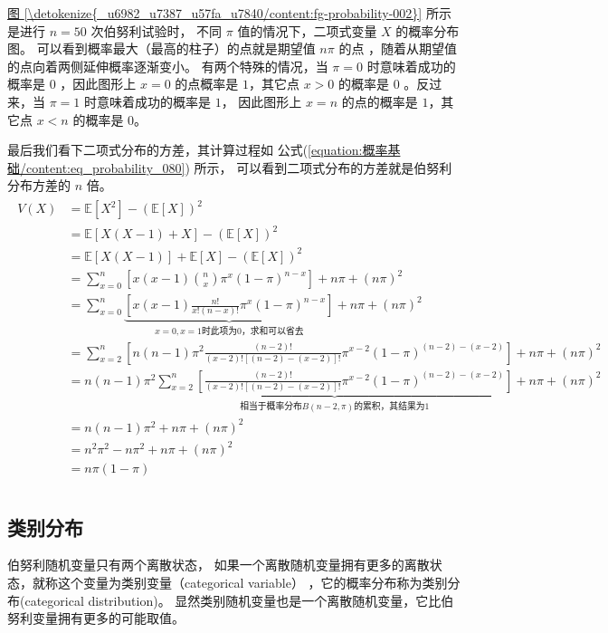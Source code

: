 \documentclass[letterpaper,10pt,english]{sphinxmanual}
\begin{document}
\hyperref[\detokenize{_u6982_u7387_u57fa_u7840/content:fg-probability-002}]{图 \ref{\detokenize{_u6982_u7387_u57fa_u7840/content:fg-probability-002}}} 所示是进行 \(n=50\) 次伯努利试验时，
不同 \(\pi\) 值的情况下，二项式变量 \(X\) 的概率分布图。
可以看到概率最大（最高的柱子）的点就是期望值 \(n \pi\) 的点
，随着从期望值的点向着两侧延伸概率逐渐变小。
有两个特殊的情况，当 \(\pi=0\) 时意味着成功的概率是 \(0\)
，因此图形上 \(x=0\) 的点概率是 \(1\)，其它点 \(x>0\) 的概率是 \(0\)
。反过来，当 \(\pi=1\) 时意味着成功的概率是 \(1\)，
因此图形上 \(x=n\) 的点的概率是 \(1\)，其它点 \(x<n\) 的概率是 \(0\)。

最后我们看下二项式分布的方差，其计算过程如 公式(\ref{equation:概率基础/content:eq_probability_080}) 所示，
可以看到二项式分布的方差就是伯努利分布方差的 \(n\) 倍。
\begin{align}\label{equation:概率基础/content:eq_probability_080}\!\begin{aligned}
V(X) &= \mathbb{E}[X^2] - (\mathbb{E}[X])^2\\
&=\mathbb{E}[X(X-1) +X ] - (\mathbb{E}[X])^2\\
&=\mathbb{E}[ X(X-1)] +\mathbb{E}[X] - (\mathbb{E}[X])^2\\
&= \sum_{x=0}^{n} \left [ x(x-1)  \binom{n}{x} \pi^x (1-\pi)^{n-x} \right ] + n \pi + (n \pi)^2\\
&= \sum_{x=0}^{n} \underbrace{\left [ x(x-1)   \frac{n!}{x!(n-x)!} \pi^x (1-\pi)^{n-x} \right ]}_{
  x=0,x=1\text{时此项为0，求和可以省去}  }+ n \pi + (n \pi)^2\\
&= \sum_{x=2}^{n} \left [ n(n-1)\pi^2 \frac{(n-2)!}{(x-2)![(n-2)-(x-2)]!} \pi^{x-2} (1-\pi)^{(n-2)-(x-2)} \right ] + n \pi + (n \pi)^2\\
&=  n(n-1)\pi^2  \underbrace{\sum_{x=2}^{n} \left [\frac{(n-2)!}{(x-2)![(n-2)-(x-2)]!} \pi^{x-2} (1-\pi)^{(n-2)-(x-2)} \right ]}_{
    \text{相当于概率分布} B(n-2,\pi) \text{的累积，其结果为}1  } + n \pi + (n \pi)^2\\
&= n(n-1)\pi^2  +  n \pi + (n \pi)^2\\
&= n^2\pi^2 - n \pi^2  +  n \pi + (n \pi)^2\\
&= n \pi(1-\pi)\\
\end{aligned}\end{align}

\subsection{类别分布}
\label{\detokenize{_u6982_u7387_u57fa_u7840/content:id20}}
伯努利随机变量只有两个离散状态，
如果一个离散随机变量拥有更多的离散状态，就称这个变量为类别变量（categorical variable）
，它的概率分布称为类别分布(categorical distribution)。
显然类别随机变量也是一个离散随机变量，它比伯努利变量拥有更多的可能取值。
\end{document}
